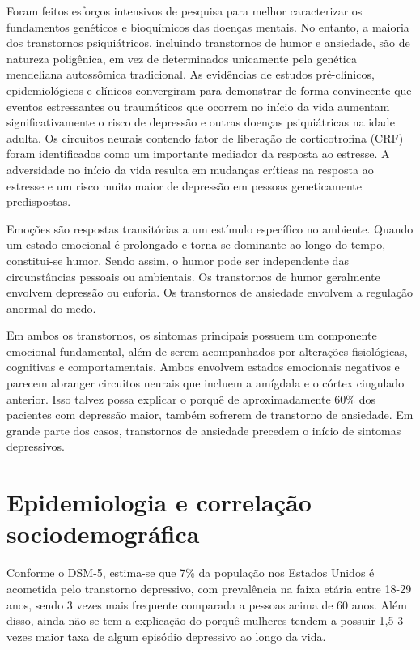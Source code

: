 Foram feitos esforços intensivos de pesquisa para melhor caracterizar os fundamentos genéticos e bioquímicos das doenças mentais. No entanto, a maioria dos transtornos psiquiátricos, incluindo transtornos de humor e ansiedade, são de natureza poligênica, em vez de determinados unicamente pela genética mendeliana autossômica tradicional. As evidências de estudos pré-clínicos, epidemiológicos e clínicos convergiram para demonstrar de forma convincente que eventos estressantes ou traumáticos que ocorrem no início da vida aumentam significativamente o risco de depressão e outras doenças psiquiátricas na idade adulta. Os circuitos neurais contendo fator de liberação de corticotrofina (CRF) foram identificados como um importante mediador da resposta ao estresse. A adversidade no início da vida resulta em mudanças críticas na resposta ao estresse e um risco muito maior de depressão em pessoas geneticamente predispostas. \cite{Nemeroff2005}

Emoções são respostas transitórias a um estímulo específico no ambiente. Quando um estado emocional é prolongado e torna-se dominante ao longo do tempo, constitui-se humor. Sendo assim, o humor pode ser independente das circunstâncias pessoais ou ambientais. Os transtornos de humor geralmente envolvem depressão ou euforia. Os transtornos de ansiedade envolvem a regulação anormal do medo.  \cite{Kandel}

Em ambos os transtornos, os sintomas principais possuem um componente emocional fundamental, além de serem acompanhados por alterações fisiológicas, cognitivas e comportamentais. Ambos envolvem estados emocionais negativos e parecem abranger circuitos neurais que incluem a amígdala e o córtex cingulado anterior. Isso talvez possa explicar o porquê de aproximadamente $60\%$ dos pacientes com depressão maior, também sofrerem de transtorno de ansiedade. Em grande parte dos casos, transtornos de ansiedade precedem o início de sintomas depressivos. \cite{Kandel}

\section{Epidemiologia e correlação sociodemográfica}

Conforme o DSM-5, estima-se que 7\% da população nos Estados Unidos é acometida pelo transtorno depressivo, com prevalência na faixa etária entre 18-29 anos, sendo 3 vezes mais frequente comparada a pessoas acima de 60 anos. Além disso, ainda não se tem a explicação do porquê mulheres tendem a possuir 1,5-3 vezes maior taxa de algum episódio depressivo ao longo da vida. \cite{DSM5}


